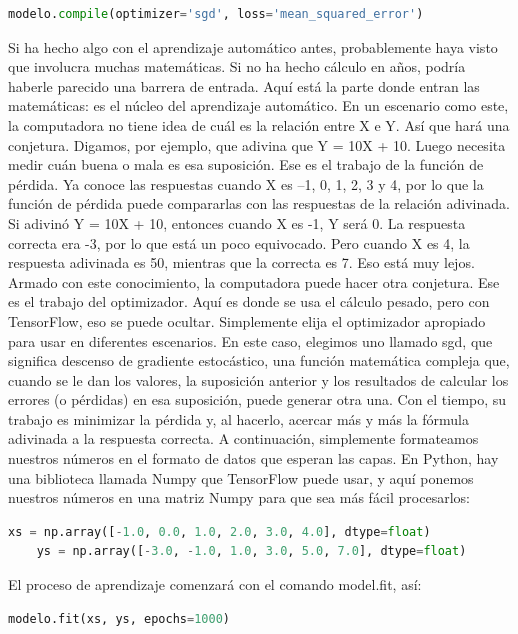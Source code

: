 \begin{lstlisting}[language=python]
modelo.compile(optimizer='sgd', loss='mean_squared_error')
\end{lstlisting}

Si ha hecho algo con el aprendizaje automático antes, probablemente haya visto que involucra muchas matemáticas. Si no ha hecho cálculo en años, podría haberle parecido una barrera de entrada. Aquí está la parte donde entran las matemáticas: es el núcleo del aprendizaje automático. En un escenario como este, la computadora no tiene idea de cuál es la relación entre X e Y. Así que hará una conjetura. Digamos, por ejemplo, que adivina que Y = 10X + 10. Luego necesita medir cuán buena o mala es esa suposición. Ese es el trabajo de la función de pérdida. Ya conoce las respuestas cuando X es –1, 0, 1, 2, 3 y 4, por lo que la función de pérdida puede compararlas con las respuestas de la relación adivinada. Si adivinó Y = 10X + 10, entonces cuando X es -1, Y será 0. La respuesta correcta era -3, por lo que está un poco equivocado. Pero cuando X es 4, la respuesta adivinada es 50, mientras que la correcta es 7. Eso está muy lejos. Armado con este conocimiento, la computadora puede hacer otra conjetura. Ese es el trabajo del optimizador. Aquí es donde se usa el cálculo pesado, pero con TensorFlow, eso se puede ocultar. Simplemente elija el optimizador apropiado para usar en diferentes escenarios. En este caso, elegimos uno llamado sgd, que significa descenso de gradiente estocástico, una función matemática compleja que, cuando se le dan los valores, la suposición anterior y los resultados de calcular los errores (o pérdidas) en esa suposición, puede generar otra una. Con el tiempo, su trabajo es minimizar la pérdida y, al hacerlo, acercar más y más la fórmula adivinada a la respuesta correcta. A continuación, simplemente formateamos nuestros números en el formato de datos que esperan las capas. En Python, hay una biblioteca llamada Numpy que TensorFlow puede usar, y aquí ponemos nuestros números en una matriz Numpy para que sea más fácil procesarlos:

\begin{lstlisting}[language=python]
	xs = np.array([-1.0, 0.0, 1.0, 2.0, 3.0, 4.0], dtype=float)
	ys = np.array([-3.0, -1.0, 1.0, 3.0, 5.0, 7.0], dtype=float)
\end{lstlisting}

El proceso de aprendizaje comenzará con el comando model.fit, así:

\begin{lstlisting}[language=python]
modelo.fit(xs, ys, epochs=1000)
\end{lstlisting}

